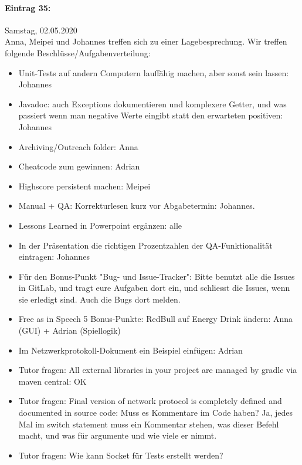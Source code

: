 \documentclass[12pt]{article}
\begin{document}
\paragraph{Eintrag 35:}
Samstag, 02.05.2020\\
Anna, Meipei und Johannes treffen sich zu einer Lagebesprechung. Wir treffen folgende Beschl\"usse/Aufgabenverteilung:
\begin{itemize}
\item Unit-Tests auf andern Computern lauff\"ahig machen, aber sonst sein lassen: Johannes
\item Javadoc: auch Exceptions dokumentieren und komplexere Getter, und was passiert wenn man negative Werte eingibt statt den erwarteten positiven: Johannes
\item Archiving/Outreach folder: Anna
\item Cheatcode zum gewinnen: Adrian
\item Highscore persistent machen: Meipei
\item Manual + QA: Korrekturlesen kurz vor Abgabetermin: Johannes.
\item Lessons Learned in Powerpoint erg\"anzen: alle
\item In der Pr\"asentation die richtigen Prozentzahlen der QA-Funktionalit\"at eintragen: Johannes
\item F\"ur den Bonus-Punkt "Bug- und Issue-Tracker": Bitte benutzt alle die Issues in GitLab, und tragt eure Aufgaben dort ein, und schliesst die Issues, wenn sie erledigt sind. Auch die Bugs dort melden.
\item Free as in Speech 5 Bonus-Punkte: RedBull auf Energy Drink \"andern: Anna (GUI) + Adrian (Spiellogik)
\item Im Netzwerkprotokoll-Dokument ein Beispiel einf\"ugen: Adrian
\item Tutor fragen: All external libraries in your project are managed by gradle via maven central: OK
\item Tutor fragen: Final version of network protocol is completely defined and documented in source code: Muss es Kommentare im Code haben? Ja, jedes Mal im switch statement muss ein Kommentar stehen, was dieser Befehl macht, und was f\"ur argumente und wie viele er nimmt.
\item Tutor fragen: Wie kann Socket f\"ur Tests erstellt werden?
\end{itemize}
\end{document}
